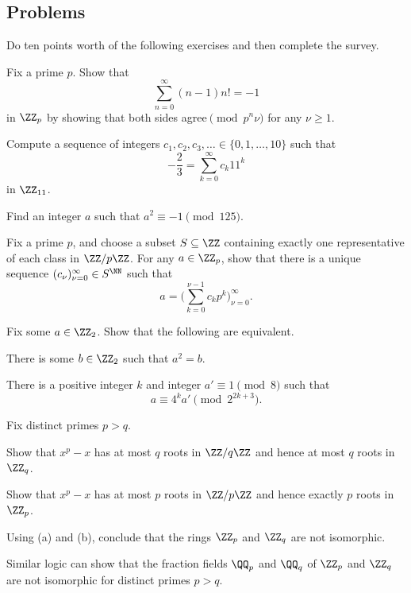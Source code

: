 \documentclass[../notes.tex]{subfiles}
\begin{document}
\subsection{Problems}
Do ten points worth of the following exercises and then complete the survey.
\begin{prob}[2 points]
	Fix a prime $p$. Show that
	\[\sum_{n=0}^\infty(n-1)n!=-1\]
	in $\ZZ_p$ by showing that both sides agree$\pmod{p^n\nu}$ for any $\nu\ge1$.
\end{prob}
\begin{prob}[2 points]
	Compute a sequence of integers $c_1,c_2,c_3,\ldots\in\{0,1,\ldots,10\}$ such that
	\[-\frac23=\sum_{k=0}^\infty c_k11^k\]
	in $\ZZ_{11}$.
\end{prob}
\begin{prob}[3 points]
	Find an integer $a$ such that $a^2\equiv-1\pmod{125}$.
\end{prob}
\begin{prob}[3 points]
	Fix a prime $p$, and choose a subset $S\subseteq\ZZ$ containing exactly one representative of each class in $\ZZ/p\ZZ$. For any $a\in\ZZ_p$, show that there is a unique sequence $(c_\nu)_{\nu=0}^\infty\in S^\NN$ such that
	\[a=\Bigg(\sum_{k=0}^{\nu-1}c_kp^k\Bigg)_{\nu=0}^\infty.\]
\end{prob}
\begin{prob}[3 points]
	Fix some $a\in\ZZ_2$. Show that the following are equivalent.
	\begin{listalph}
		\item There is some $b\in\ZZ_2$ such that $a^2=b$.
		\item There is a positive integer $k$ and integer $a'\equiv1\pmod8$ such that
		\[a\equiv 4^ka'\pmod{2^{2k+3}}.\]
	\end{listalph}
\end{prob}
\begin{prob}[4 points]
	Fix distinct primes $p>q$.
	\begin{listalph}
		\item Show that $x^p-x$ has at most $q$ roots in $\ZZ/q\ZZ$ and hence at most $q$ roots in $\ZZ_q$.
		\item Show that $x^p-x$ has at most $p$ roots in $\ZZ/p\ZZ$ and hence exactly $p$ roots in $\ZZ_p$.
		\item Using (a) and (b), conclude that the rings $\ZZ_p$ and $\ZZ_q$ are not isomorphic.
	\end{listalph}
	Similar logic can show that the fraction fields $\QQ_p$ and $\QQ_q$ of $\ZZ_p$ and $\ZZ_q$ are not isomorphic for distinct primes $p>q$.
\end{prob}
\end{document}
